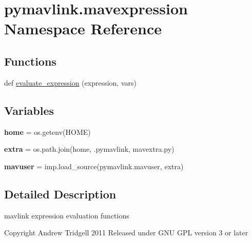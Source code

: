 \hypertarget{namespacepymavlink_1_1mavexpression}{}\section{pymavlink.\+mavexpression Namespace Reference}
\label{namespacepymavlink_1_1mavexpression}
\subsection*{Functions}
\begin{DoxyCompactItemize}
\item 
def \hyperlink{namespacepymavlink_1_1mavexpression_a8fee43c3020a15e908bbd7c6bce1e7ca}{evaluate\+\_\+expression} (expression, vars)
\end{DoxyCompactItemize}
\subsection*{Variables}
\begin{DoxyCompactItemize}
\item 
\mbox{\label{namespacepymavlink_1_1mavexpression_afc944dcbe25c09a86ea53d042ce147ad}} 
{\bfseries home} = os.\+getenv(\textquotesingle{}H\+O\+ME\textquotesingle{})
\item 
\mbox{\label{namespacepymavlink_1_1mavexpression_a1a68cb085c05aa0acd7c862299f8ea74}} 
{\bfseries extra} = os.\+path.\+join(home, \textquotesingle{}.pymavlink\textquotesingle{}, \textquotesingle{}mavextra.\+py\textquotesingle{})
\item 
\mbox{\label{namespacepymavlink_1_1mavexpression_a4b72830e24885390bf68490e1acfcec7}} 
{\bfseries mavuser} = imp.\+load\+\_\+source(\textquotesingle{}pymavlink.\+mavuser\textquotesingle{}, extra)
\end{DoxyCompactItemize}


\subsection{Detailed Description}
\begin{DoxyVerb}mavlink expression evaluation functions

Copyright Andrew Tridgell 2011
Released under GNU GPL version 3 or later
\end{DoxyVerb}
 

